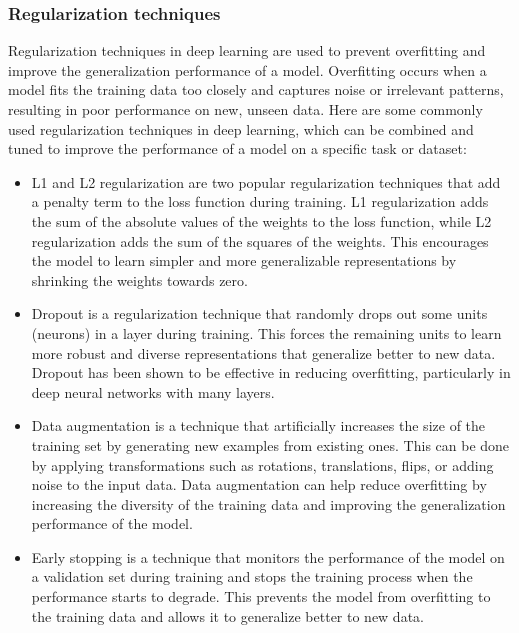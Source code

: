 \subsubsection{Regularization techniques}
\label{subsubsec:3_regularization}

Regularization techniques in deep learning are used to prevent overfitting and improve the generalization performance of a model. Overfitting occurs when a model fits the training data too closely and captures noise or irrelevant patterns, resulting in poor performance on new, unseen data. Here are some commonly used regularization techniques in deep learning, which can be combined and tuned to improve the performance of a model on a specific task or dataset:

\begin{itemize}
	\item L1 and L2 regularization are two popular regularization techniques that add a penalty term to the loss function during training. L1 regularization adds the sum of the absolute values of the weights to the loss function, while L2 regularization adds the sum of the squares of the weights. This encourages the model to learn simpler and more generalizable representations by shrinking the weights towards zero.
	\item Dropout is a regularization technique that randomly drops out some units (neurons) in a layer during training. This forces the remaining units to learn more robust and diverse representations that generalize better to new data. Dropout has been shown to be effective in reducing overfitting, particularly in deep neural networks with many layers.
	
	\item Data augmentation is a technique that artificially increases the size of the training set by generating new examples from existing ones. This can be done by applying transformations such as rotations, translations, flips, or adding noise to the input data. Data augmentation can help reduce overfitting by increasing the diversity of the training data and improving the generalization performance of the model.
	
	\item Early stopping is a technique that monitors the performance of the model on a validation set during training and stops the training process when the performance starts to degrade. This prevents the model from overfitting to the training data and allows it to generalize better to new data.
	

\end{itemize}
